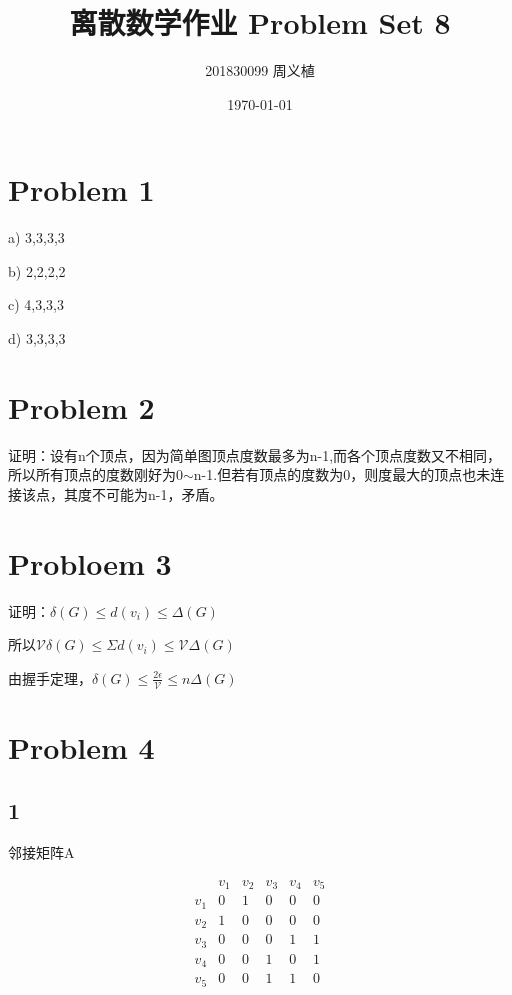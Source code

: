 \documentclass{article}
\title{离散数学作业 Problem Set 8}
\author{201830099 周义植}
\date{\today}
\begin{document}
\maketitle
\section*{Problem 1}
a) 3,3,3,3

b) 2,2,2,2

c) 4,3,3,3

d) 3,3,3,3

\section*{Problem 2}
证明：设有n个顶点，因为简单图顶点度数最多为n-1,而各个顶点度数又不相同，所以所有顶点的度数刚好为0$\sim $n-1.但若有顶点的度数为0，则度最大的顶点也未连接该点，其度不可能为n-1，矛盾。

\section*{Probloem 3}
证明：$\delta (G)\leqslant d(v_i) \leqslant \varDelta (G)$

所以$\mathcal{V} \delta (G)\leqslant \Sigma d(v_i) \leqslant \mathcal{V} \varDelta (G)$

由握手定理，$ \delta (G)\leqslant \frac{2\epsilon}{\mathcal{V} } \leqslant n\varDelta (G)$
\section*{Problem 4}
\subsection*{1}
\begin{center}
    邻接矩阵A
\end{center}
\begin{equation}
    \begin{array}{c|c|c|c|c|c} 
        & v_{1} & v_{2} & v_{3} & v_{4} & v_{5} \\
        \hline v_{1} & 0 & 1 & 0 & 0 & 0 \\
        \hline v_{2} & 1 & 0 & 0 & 0 & 0 \\
        \hline v_{3} & 0 & 0 & 0 & 1 & 1 \\
        \hline v_{4} & 0 & 0 & 1 & 0 & 1 \\
        \hline v_{5} & 0 & 0 & 1 & 1 & 0
        \end{array}
\end{equation}
\end{document}
